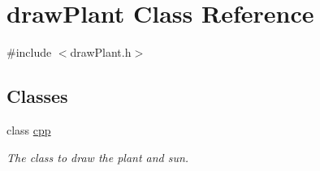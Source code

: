 \hypertarget{classdrawPlant}{
\section{drawPlant Class Reference}
\label{classdrawPlant}
}


{\ttfamily \#include $<$drawPlant.h$>$}\subsection*{Classes}
\begin{DoxyCompactItemize}
\item 
class \hyperlink{classdrawPlant_1_1cpp}{cpp}
\begin{DoxyCompactList}\small\item\em The class to draw the plant and sun. \item\end{DoxyCompactList}\end{DoxyCompactItemize}
